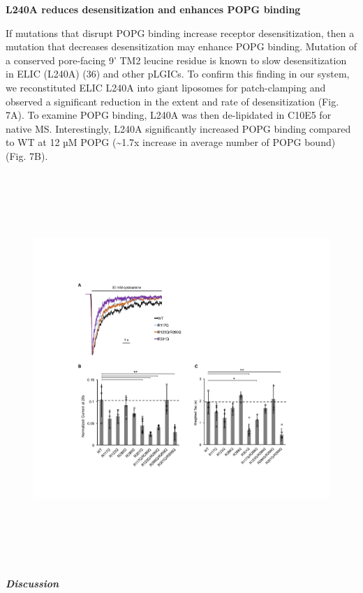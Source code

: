 \textbf{L240A reduces desensitization and enhances POPG binding}

If mutations that disrupt POPG binding increase receptor
desensitization, then a mutation that decreases desensitization may
enhance POPG binding. Mutation of a conserved pore-facing 9' TM2 leucine
residue is known to slow desensitization in ELIC (L240A) (36) and other
pLGICs. To confirm this finding in our system, we reconstituted ELIC
L240A into giant liposomes for patch-clamping and observed a significant
reduction in the extent and rate of desensitization (Fig. 7A). To
examine POPG binding, L240A was then de-lipidated in C10E5 for native
MS. Interestingly, L240A significantly increased POPG binding compared
to WT at 12 µM POPG (\textasciitilde{}1.7x increase in average number of
POPG bound) (Fig. 7B).
\begin{figure}
\includegraphics[width=6.55625in,height=5.83358in]{./pandoc_test/media/image7.pdf}
\end{figure}
\textbf{\emph{Discussion}}

